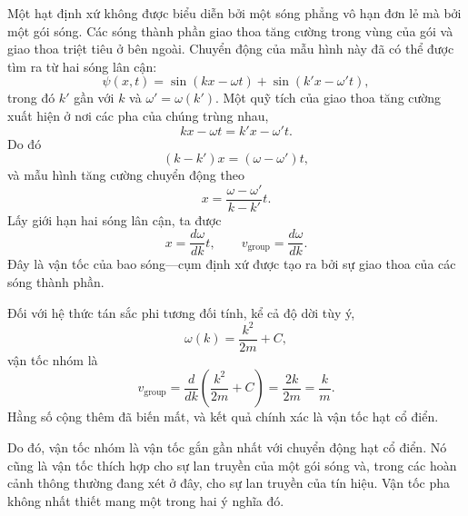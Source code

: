 Một hạt định xứ không được biểu diễn bởi một sóng phẳng vô hạn đơn lẻ mà bởi một gói sóng. Các sóng thành phần giao thoa tăng cường trong vùng của gói và giao thoa triệt tiêu ở bên ngoài. Chuyển động của mẫu hình này đã có thể được tìm ra từ hai sóng lân cận:
\begin{equation}
\psi(x,t)=
\sin(kx-\omega t)+
\sin(k'x-\omega't),
\end{equation}
trong đó \(k'\) gần với \(k\) và \(\omega'=\omega(k')\). Một quỹ tích của giao thoa tăng cường xuất hiện ở nơi các pha của chúng trùng nhau,
\begin{equation}
kx-\omega t=k'x-\omega't.
\end{equation}
Do đó
\begin{equation}
(k-k')x=(\omega-\omega')t,
\end{equation}
và mẫu hình tăng cường chuyển động theo
\begin{equation}
x=\frac{\omega-\omega'}{k-k'}t.
\end{equation}
Lấy giới hạn hai sóng lân cận, ta được
\begin{equation}
x=\frac{d\omega}{dk}t,
\qquad
v_{\mathrm{group}}=\frac{d\omega}{dk}.
\end{equation}
Đây là vận tốc của bao sóng---cụm định xứ được tạo ra bởi sự giao thoa của các sóng thành phần.

Đối với hệ thức tán sắc phi tương đối tính, kể cả độ dời tùy ý,
\begin{equation}
\omega(k)=\frac{k^2}{2m}+C,
\end{equation}
vận tốc nhóm là
\begin{equation}
v_{\mathrm{group}}
=\frac{d}{dk}\left(\frac{k^2}{2m}+C\right)
=\frac{2k}{2m}
=\frac{k}{m}.
\end{equation}
Hằng số cộng thêm đã biến mất, và kết quả chính xác là vận tốc hạt cổ điển.

\begin{classroomqa}
\end{classroomqa}

Do đó, vận tốc nhóm là vận tốc gắn gần nhất với chuyển động hạt cổ điển. Nó cũng là vận tốc thích hợp cho sự lan truyền của một gói sóng và, trong các hoàn cảnh thông thường đang xét ở đây, cho sự lan truyền của tín hiệu. Vận tốc pha không nhất thiết mang một trong hai ý nghĩa đó.

